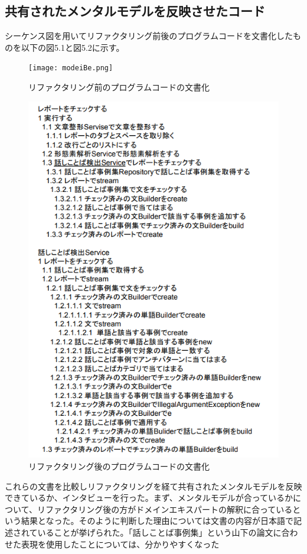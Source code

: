\documentclass[11pt, a4paper]{jreport}
\begin{document}
\subsection{共有されたメンタルモデルを反映させたコード}
シーケンス図を用いてリファクタリング前後のプログラムコードを文書化したものを以下の図5.1と図5.2に示す。
\begin{figure}[H]
\centering
\texttt{[image: modeiBe.png]}
\caption{リファクタリング前のプログラムコードの文書化}
\label{fig:enter-label}
\end{figure}
\begin{figure}[H]
\centering
\includegraphics[width=1\linewidth]{image/modelAf.png}
\caption{リファクタリング後のプログラムコードの文書化}
\label{fig:enter-label}
\end{figure}
これらの文書を比較しリファクタリングを経て共有されたメンタルモデルを反映できているか、インタビューを行った。まず、メンタルモデルが合っているかについて、リファクタリング後の方がドメインエキスパートの解釈に合っているという結果となった。そのように判断した理由については文書の内容が日本語で記述されていることが挙げられた。「話しことば事例集」という山下の論文に合わせた表現を使用したことについては、分かりやすくなった
\end{document}
